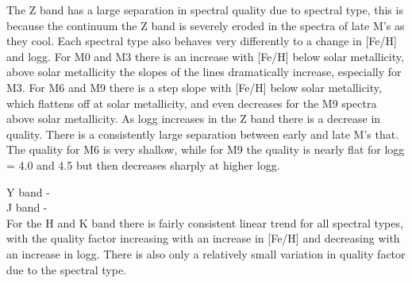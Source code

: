 The Z band has a large separation in spectral quality due to spectral type, this is because the continuum the Z band is severely eroded in the spectra of late M's as they cool. Each spectral type also behaves very differently to a change in [Fe/H] and logg. For M0 and M3 there is an increase with [Fe/H] below solar metallicity, above solar metallicity the slopes of the lines dramatically increase, especially for M3. For M6 and M9 there is a step slope with [Fe/H] below solar metallicity, which flattens off at solar metallicity, and even decreases for the M9 spectra above solar metallicity. 
As logg increases in the Z band there is a decrease in quality. There is a consistently large separation between early and late M's that. The quality for M6 is very shallow, while for M9 the quality is nearly flat for logg = 4.0 and 4.5 but then decreases sharply at higher logg. 

Y band -\\

J band - \\

For the H and K band there is fairly consistent linear trend for all spectral types, with the quality factor increasing with an increase in [Fe/H] and decreasing with an increase in logg. There is also only a relatively small variation in quality factor due to the spectral type.



